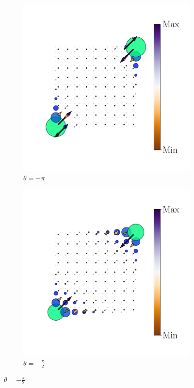 \begin{figure}[h!]
     
     \begin{minipage}[h!]{1.1\textwidth}
          \begin{subfigure}[b!]{0.2 \textwidth}
             \caption{$\theta = -\pi$}
             \includegraphics[width=\textwidth]{Imagenes/Resultados_pump_Cuadrado/x/hoti_pomp_x_neg1.pdf}
         \end{subfigure}\hspace*{-0.5em}
          \begin{subfigure}[b!]{0.2 \textwidth}
             \caption*{$\theta = -\frac{\pi}{2}$}
             \includegraphics[width=\textwidth]{Imagenes/Resultados_pump_Cuadrado/x/hoti_pomp_x_neg2.pdf}

\end{subfigure}
\end{minipage}
\end{figure}
